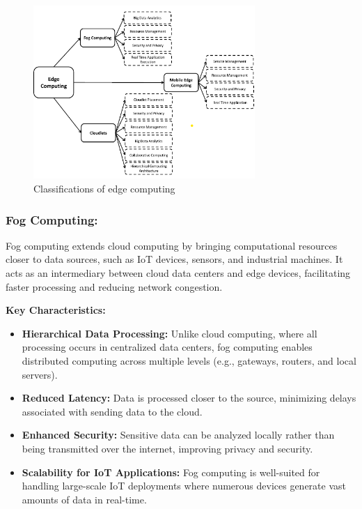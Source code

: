 \documentclass[runningheads]{llncs}
\begin{document}
\begin{figure}[ht]
    \centering
    \includegraphics[width=0.75\textwidth]{IMG/1.png}
    \caption{Classifications of edge computing}
    \label{fig:edge_classifications}
    \end{figure}
\FloatBarrier

\subsubsection{Fog Computing:}
Fog computing extends cloud computing by bringing computational resources closer to data sources, such as IoT devices, sensors, and industrial machines. It acts as an intermediary between cloud data centers and edge devices, facilitating faster processing and reducing network congestion.

\textbf{Key Characteristics:}
\begin{itemize}
    \item \textbf{Hierarchical Data Processing:} Unlike cloud computing, where all processing occurs in centralized data centers, fog computing enables distributed computing across multiple levels (e.g., gateways, routers, and local servers).
    \item \textbf{Reduced Latency:} Data is processed closer to the source, minimizing delays associated with sending data to the cloud.
    \item \textbf{Enhanced Security:} Sensitive data can be analyzed locally rather than being transmitted over the internet, improving privacy and security.
    \item \textbf{Scalability for IoT Applications:} Fog computing is well-suited for handling large-scale IoT deployments where numerous devices generate vast amounts of data in real-time.
\end{itemize}
\end{document}
